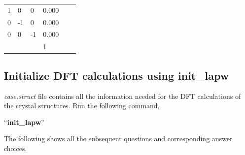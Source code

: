 \documentclass[12 pt]{article}
\begin{document}
\begin{itemize}[leftmargin=0.2in]
\begin{landscape}
\begin{table}[ht]
{{\begin{tabular}{llllll}
  1				& 0			& 0		& 0.000		&		&	\\

  0				& -1			& 0		& 0.000		&		&	\\

  0				& 0			& -1		& 0.000		&		&	\\

				&			&		& 1		&		&	\\

  \end{tabular}
}

}

  \end{table}

 \end{landscape}

    \end{itemize}
  \cleardoublepage

      \subsection{Initialize DFT calculations using init\_lapw}

  \emph{case.struct} file contains all the information needed for the DFT calculations of the crystal structures.
 Run the following command, 

  ``\textbf{init\_lapw}''

  The following shows all the subsequent questions and corresponding answer choices.
\end{document}

